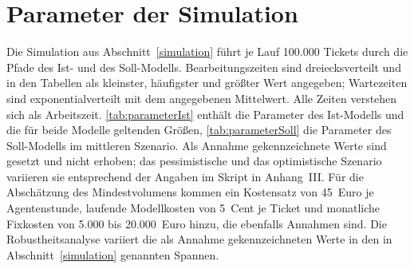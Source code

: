 %
\clearpage
\section{Parameter der Simulation}
\label{anhangSimulation}

Die Simulation aus Abschnitt~\ref{simulation} f\"uhrt je Lauf 100.000 Tickets durch die Pfade des Ist- und des Soll-Modells. Bearbeitungszeiten sind dreiecksverteilt und in den Tabellen als kleinster, h\"aufigster und gr\"o{\ss}ter Wert angegeben; Wartezeiten sind exponentialverteilt mit dem angegebenen Mittelwert. Alle Zeiten verstehen sich als Arbeitszeit. \autoref{tab:parameterIst} enth\"alt die Parameter des Ist-Modells und die f\"ur beide Modelle geltenden Gr\"o{\ss}en, \autoref{tab:parameterSoll} die Parameter des Soll-Modells im mittleren Szenario. Als Annahme gekennzeichnete Werte sind gesetzt und nicht erhoben; das pessimistische und das optimistische Szenario variieren sie entsprechend der Angaben im Skript in Anhang~III. F\"ur die Absch\"atzung des Mindestvolumens kommen ein Kostensatz von 45~Euro je Agentenstunde, laufende Modellkosten von 5~Cent je Ticket und monatliche Fixkosten von 5.000 bis 20.000~Euro hinzu, die ebenfalls Annahmen sind. Die Robustheitsanalyse variiert die als Annahme gekennzeichneten Werte in den in Abschnitt~\ref{simulation} genannten Spannen.

